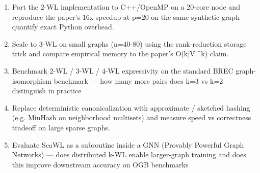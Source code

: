 \begin{enumerate}[leftmargin=1.6em,itemsep=0.2em,topsep=0.2em,label=Q\arabic*.]
\item Port the 2-WL implementation to C++/OpenMP on a 20-core node and reproduce the paper's 16x speedup at p=20 on the same synthetic graph --- quantify exact Python overhead.
\item Scale to 3-WL on small graphs (n=40-80) using the rank-reduction storage trick and compare empirical memory to the paper's O(k|V|\textasciicircum{}k) claim.
\item Benchmark 2-WL / 3-WL / 4-WL expressivity on the standard BREC graph-isomorphism benchmark --- how many more pairs does k=3 vs k=2 distinguish in practice
\item Replace deterministic canonicalization with approximate / sketched hashing (e.g. MinHash on neighborhood multisets) and measure speed vs correctness tradeoff on large sparse graphs.
\item Evaluate ScaWL as a subroutine inside a GNN (Provably Powerful Graph Networks) --- does distributed k-WL enable larger-graph training and does this improve downstream accuracy on OGB benchmarks
\end{enumerate}


